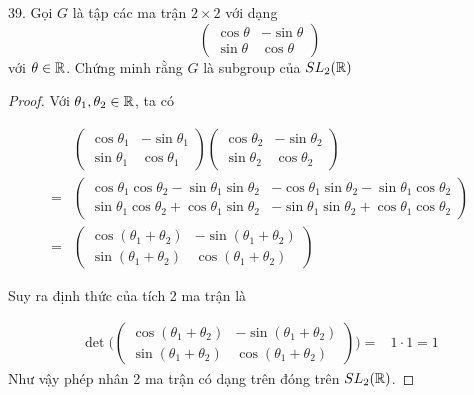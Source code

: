 39. Gọi $G$ là tập các ma trận $2 \times 2$ với dạng
$$\begin{pmatrix}
    \cos \theta & -\sin \theta \\ \sin \theta & \cos \theta
\end{pmatrix}$$ với $\theta \in \mathbb{R}$. Chứng minh rằng $G$ là subgroup của $SL_2 (\mathbb{R})$
    
\begin{proof}
        Với $\theta_1, \theta_2 \in \mathbb{R}$, ta có
        
        \begin{align*}
        & \begin{pmatrix}
            \cos \theta_1 & -\sin \theta_1 \\ \sin \theta_1 & \cos \theta_1
        \end{pmatrix} \begin{pmatrix}
            \cos \theta_2 & -\sin \theta_2 \\ \sin \theta_2 & \cos \theta_2
        \end{pmatrix} \\
        = & \begin{pmatrix}
            \cos \theta_1 \cos \theta_2 - \sin \theta_1 \sin \theta_2 & -\cos \theta_1 \sin \theta_2 - \sin \theta_1 \cos \theta_2 \\ 
            \sin \theta_1 \cos \theta_2 + \cos \theta_1 \sin \theta_2 & -\sin \theta_1 \sin \theta_2 + \cos \theta_1 \cos \theta_2
        \end{pmatrix} \\
        = & \begin{pmatrix}
            \cos (\theta_1 + \theta_2) & -\sin (\theta_1 + \theta_2) \\
            \sin (\theta_1 + \theta_2) & \cos (\theta_1 + \theta_2)
        \end{pmatrix}
        \end{align*}
        
        Suy ra định thức của tích 2 ma trận là

        \begin{align*}
            \det \Biggl(\begin{pmatrix}
                \cos (\theta_1 + \theta_2) & -\sin (\theta_1 + \theta_2) \\
                \sin (\theta_1 + \theta_2) & \cos (\theta_1 + \theta_2)
            \end{pmatrix}\Biggr)
            = & 1 \cdot 1 = 1
        \end{align*}
        Như vậy phép nhân 2 ma trận có dạng trên đóng trên $SL_2 (\mathbb{R})$.
        

\end{proof}
